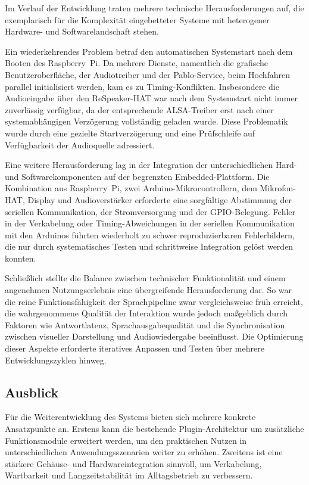 Im Verlauf der Entwicklung traten mehrere technische Herausforderungen auf, die exemplarisch für die Komplexität eingebetteter Systeme mit heterogener Hardware- und Softwarelandschaft stehen.

Ein wiederkehrendes Problem betraf den automatischen Systemstart nach dem Booten des Raspberry~Pi.
Da mehrere Dienste, namentlich die grafische Benutzeroberfläche, der Audiotreiber und der Pablo-Service, beim Hochfahren parallel initialisiert werden, kam es zu Timing-Konflikten.
Insbesondere die Audioeingabe über den ReSpeaker-HAT war nach dem Systemstart nicht immer zuverlässig verfügbar, da der entsprechende ALSA-Treiber erst nach einer systemabhängigen Verzögerung vollständig geladen wurde.
Diese Problematik wurde durch eine gezielte Startverzögerung und eine Prüfschleife auf Verfügbarkeit der Audioquelle adressiert.

Eine weitere Herausforderung lag in der Integration der unterschiedlichen Hard- und Softwarekomponenten auf der begrenzten Embedded-Plattform.
Die Kombination aus Raspberry~Pi, zwei Arduino-Mikrocontrollern, dem Mikrofon-HAT, Display und Audioverstärker erforderte eine sorgfältige Abstimmung der seriellen Kommunikation, der Stromversorgung und der GPIO-Belegung.
Fehler in der Verkabelung oder Timing-Abweichungen in der seriellen Kommunikation mit den Arduinos führten wiederholt zu schwer reproduzierbaren Fehlerbildern, die nur durch systematisches Testen und schrittweise Integration gelöst werden konnten.

Schließlich stellte die Balance zwischen technischer Funktionalität und einem angenehmen Nutzungserlebnis eine übergreifende Herausforderung dar.
So war die reine Funktionsfähigkeit der Sprachpipeline zwar vergleichsweise früh erreicht, die wahrgenommene Qualität der Interaktion wurde jedoch maßgeblich durch Faktoren wie Antwortlatenz, Sprachausgabequalität und die Synchronisation zwischen visueller Darstellung und Audiowiedergabe beeinflusst.
Die Optimierung dieser Aspekte erforderte iteratives Anpassen und Testen über mehrere Entwicklungszyklen hinweg.


\subsection{Ausblick}

Für die Weiterentwicklung des Systems bieten sich mehrere konkrete Ansatzpunkte an. 
Erstens kann die bestehende Plugin-Architektur um zusätzliche Funktionsmodule erweitert werden, um den praktischen Nutzen in unterschiedlichen Anwendungsszenarien weiter zu erhöhen. 
Zweitens ist eine stärkere Gehäuse- und Hardwareintegration sinnvoll, um Verkabelung, Wartbarkeit und Langzeitstabilität im Alltagsbetrieb zu verbessern.

